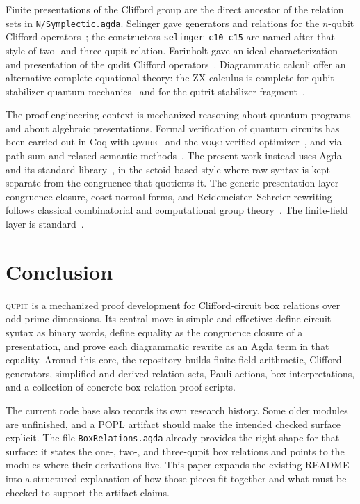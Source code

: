 \documentclass[sigplan,screen,review,anonymous]{acmart}
\newcommand{\Agda}{Agda\xspace}
\newcommand{\Qupit}{\textsc{qupit}\xspace}
\newcommand{\file}[1]{\texttt{#1}}
\begin{document}
Finite presentations of the Clifford group are the direct ancestor of
the relation sets in \file{N/Symplectic.agda}.  Selinger gave generators
and relations for the \(n\)-qubit Clifford operators~\cite{Selinger2015};
the constructors \texttt{selinger-c10}--\texttt{c15} are named after that
style of two- and three-qupit relation.  Farinholt gave an ideal
characterization and presentation of the qudit Clifford
operators~\cite{Farinholt2014}.  Diagrammatic calculi offer an
alternative complete equational theory: the ZX-calculus is complete for
qubit stabilizer quantum mechanics~\cite{CoeckeDuncan2011,Backens2014}
and for the qutrit stabilizer fragment~\cite{Wang2018}.

The proof-engineering context is mechanized reasoning about quantum
programs and about algebraic presentations.  Formal verification of
quantum circuits has been carried out in Coq with
\textsc{qwire}~\cite{Paykin2017} and the \textsc{voqc} verified
optimizer~\cite{Hietala2021}, and via path-sum and related semantic
methods~\cite{Amy2018}.  The present work instead uses
\Agda~\cite{Norell2007,BoveDybjerNorell2009} and its standard
library~\cite{AgdaStdlib}, in the setoid-based style where raw syntax is
kept separate from the congruence that quotients it.  The generic
presentation layer---congruence closure, coset normal forms, and
Reidemeister--Schreier rewriting---follows classical combinatorial and
computational group
theory~\cite{MagnusKarrassSolitar,LyndonSchupp,Johnson1997,Sims1994,HoltEickOBrien}.
The finite-field layer is standard~\cite{LidlNiederreiter,IrelandRosen}.

\section{Conclusion}

\Qupit is a mechanized proof development for Clifford-circuit box
relations over odd prime dimensions.  Its central move is simple and
effective: define circuit syntax as binary words, define equality as
the congruence closure of a presentation, and prove each diagrammatic
rewrite as an \Agda term in that equality.  Around this core, the
repository builds finite-field arithmetic, Clifford generators,
simplified and derived relation sets, Pauli actions, box
interpretations, and a collection of concrete box-relation proof
scripts.

The current code base also records its own research history.  Some
older modules are unfinished, and a POPL artifact should make the
intended checked surface explicit.  The file \file{BoxRelations.agda}
already provides the right shape for that surface: it states the
one-, two-, and three-qupit box relations and points to the modules
where their derivations live.  This paper expands the existing README
into a structured explanation of how those pieces fit together and
what must be checked to support the artifact claims.
\end{document}
